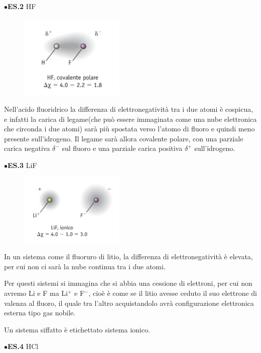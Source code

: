 \vspace{0.2cm}$\bullet$\textbf{ES.2} HF

\begin{figure}[htp]
    \centering
    \includegraphics[width=5cm]{immagini/HF.png}
\end{figure}
Nell'acido fluoridrico la differenza di elettronegatività tra i due atomi è cospicua, e infatti la carica di legame(che può essere immaginata come una nube elettronica che circonda i due atomi) sarà più spostata verso l'atomo di fluoro e quindi meno presente sull'idrogeno. Il legame sarà allora covalente polare, con una parziale carica negativa $\delta^-$ sul fluoro e una parziale carica positiva $\delta^+$ sull'idrogeno. 

\vspace{0.2cm}$\bullet$\textbf{ES.3} LiF

\begin{figure}[htp]
    \centering
    \includegraphics[width=5cm]{immagini/LiF.png}
\end{figure}

\vspace{-0.4cm}In un sistema come il fluoruro di litio, la differenza di elettronegatività è elevata, per cui non ci sarà la nube continua tra i due atomi.

Per questi sistemi si immagina che si abbia una cessione di elettroni, per cui non avremo Li e F ma Li$^+$ e F$^-$, cioè è come se il litio avesse ceduto il suo elettrone di valenza al fluoro, il quale tra l'altro acquistandolo avrà configurazione elettronica esterna tipo gas nobile.

Un sistema siffatto è etichettato sistema ionico.

\vspace{0.2cm}$\bullet$\textbf{ES.4} HCl

